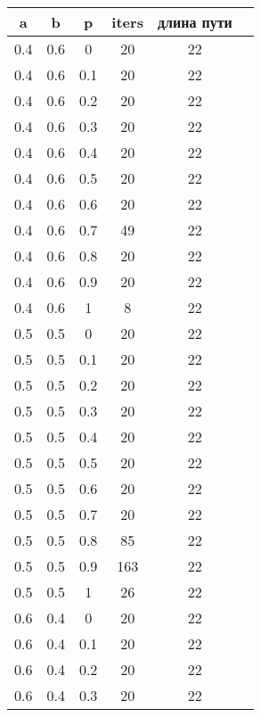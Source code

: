 \begin{table}[!h]
	\begin{center}
		\begin{tabular}{c@{\hspace{7mm}}c@{\hspace{7mm}}c@{\hspace{7mm}}c@{\hspace{7mm}}c@{\hspace{7mm}}c}
			\toprule
			a        &b      &p      &iters &длина пути \\
			\midrule
			0.4     &0.6    &0      &20    &22\\
			0.4     &0.6    &0.1    &20    &22\\
			0.4     &0.6    &0.2    &20    &22\\
			0.4     &0.6    &0.3    &20    &22\\
			0.4     &0.6    &0.4    &20    &22\\
			0.4     &0.6    &0.5    &20    &22\\
			0.4     &0.6    &0.6    &20    &22\\
			0.4     &0.6    &0.7    &49    &22\\
			0.4     &0.6    &0.8    &20    &22\\
			0.4     &0.6    &0.9    &20    &22\\
			0.4     &0.6    &1      &8     &22\\
			\midrule
			0.5     &0.5    &0      &20    &22\\
			0.5     &0.5    &0.1    &20    &22\\
			0.5     &0.5    &0.2    &20    &22\\
			0.5     &0.5    &0.3    &20    &22\\
			0.5     &0.5    &0.4    &20    &22\\
			0.5     &0.5    &0.5    &20    &22\\
			0.5     &0.5    &0.6    &20    &22\\
			0.5     &0.5    &0.7    &20    &22\\
			0.5     &0.5    &0.8    &85    &22\\
			0.5     &0.5    &0.9    &163   &22\\
			0.5     &0.5    &1      &26    &22\\
			\midrule
			0.6     &0.4    &0      &20    &22\\
			0.6     &0.4    &0.1    &20    &22\\
			0.6     &0.4    &0.2    &20    &22\\
			0.6     &0.4    &0.3    &20    &22\\

\end{tabular}
\end{center}
\end{table}
